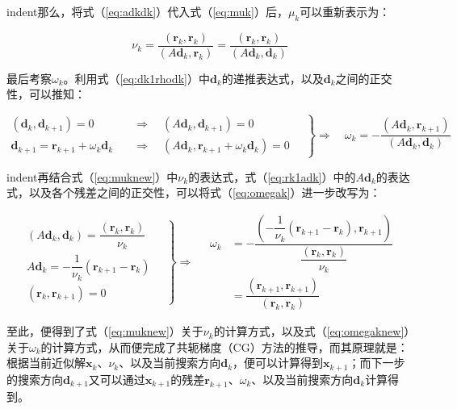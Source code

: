 \documentclass[UTF8,nofonts]{ctexart}
\begin{document}
indent那么，将式（\ref{eq:adkdk}）代入式（\ref{eq:muk}）后，$\mu_k$可以重新表示为：

\begin{equation}
\label{eq:muknew}
\nu_k=\dfrac{(\boldsymbol{r}_k,\boldsymbol{r}_k)}{(A\boldsymbol{d}_k,\boldsymbol{r}_k)}=\dfrac{(\boldsymbol{r}_k,\boldsymbol{r}_k)}{(A\boldsymbol{d}_k,\boldsymbol{d}_k)}
\end{equation}

最后考察$\omega_k$。利用式（\ref{eq:dk1rhodk}）中$\boldsymbol{d}_k$的递推表达式，以及$\boldsymbol{d}_k$之间的正交性，可以推知：

\begin{equation}
\label{eq:omegak}
\left.
\begin{aligned}
(\boldsymbol{d}_k,\boldsymbol{d}_{k+1})=0\quad&\Rightarrow\quad(A\boldsymbol{d}_k,\boldsymbol{d}_{k+1})=0 \\
\boldsymbol{d}_{k+1}=\boldsymbol{r}_{k+1}+\omega_k\boldsymbol{d}_k\quad&\Rightarrow\quad(A\boldsymbol{d}_k,\boldsymbol{r}_{k+1}+\omega_k\boldsymbol{d}_k)=0
\end{aligned}\quad\right\}\Longrightarrow\quad
\omega_k=-\dfrac{(A\boldsymbol{d}_k,\boldsymbol{r}_{k+1})}{(A\boldsymbol{d}_k,\boldsymbol{d}_k)}
\end{equation}

indent再结合式（\ref{eq:muknew}）中$\nu_k$的表达式，式（\ref{eq:rk1adk}）中的$A\boldsymbol{d}_k$的表达式，以及各个残差之间的正交性，可以将式（\ref{eq:omegak}）进一步改写为：

\begin{equation}
\label{eq:omegaknew}
\left.
\begin{aligned}
(A\boldsymbol{d}_k,\boldsymbol{d}_k)=\dfrac{(\boldsymbol{r}_k,\boldsymbol{r}_k)}{\nu_k} \\
A\boldsymbol{d}_k=-\dfrac{1}{\nu_k}(\boldsymbol{r}_{k+1}-\boldsymbol{r}_k) \\
(\boldsymbol{r}_k,\boldsymbol{r}_{k+1})=0
\end{aligned}\quad\right\}\Longrightarrow\quad
\begin{aligned}
\omega_k &= -\dfrac{\left(-\dfrac{1}{\nu_k}(\boldsymbol{r}_{k+1}-\boldsymbol{r}_k),\boldsymbol{r}_{k+1}\right)}{\dfrac{(\boldsymbol{r}_k,\boldsymbol{r}_k)}{\nu_k}} \\
&= \dfrac{(\boldsymbol{r}_{k+1},\boldsymbol{r}_{k+1})}{(\boldsymbol{r}_k,\boldsymbol{r}_k)}
\end{aligned}
\end{equation}

至此，便得到了式（\ref{eq:muknew}）关于$\nu_k$的计算方式，以及式（\ref{eq:omegaknew}）关于$\omega_k$的计算方式，从而便完成了共轭梯度（CG）方法的推导，而其原理就是：根据当前近似解$\boldsymbol{x}_k$、$\nu_k$、以及当前搜索方向$\boldsymbol{d}_k$，便可以计算得到$\boldsymbol{x}_{k+1}$；而下一步的搜索方向$\boldsymbol{d}_{k+1}$又可以通过$\boldsymbol{x}_{k+1}$的残差$\boldsymbol{r}_{k+1}$、$\omega_{k}$、以及当前搜索方向$\boldsymbol{d}_k$计算得到。
\end{document}
